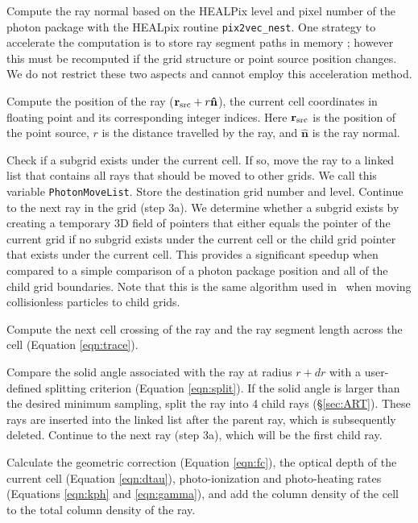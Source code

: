 \documentclass[useAMS,usenatbib]{mn2e}
\begin{document}
 Compute the ray normal based on the HEALPix level and pixel
number of the photon package with the HEALpix routine
\texttt{pix2vec\_nest}.  One strategy to accelerate the computation is
to store ray segment paths in memory \citep{Abel02_RT,
  Krumholz07_ART}; however this must be recomputed if the grid
structure or point source position changes.  We do not restrict these
two aspects and cannot employ this acceleration method.

 Compute the position of the ray ($\mathbf{r}_{\rm src} + r
\mathbf{\hat{n}}$), the current cell coordinates in floating point and
its corresponding integer indices.  Here $\mathbf{r}_{\rm src}$ is the
position of the point source, $r$ is the distance travelled by the
ray, and $\mathbf{\hat{n}}$ is the ray normal.

 Check if a subgrid exists under the current cell.  If so,
move the ray to a linked list that contains all rays that should be
moved to other grids.  We call this variable \texttt{PhotonMoveList}.
Store the destination grid number and level.  Continue to the next ray
in the grid (step 3a).  We determine whether a subgrid exists by
creating a temporary 3D field of pointers that either equals the
pointer of the current grid if no subgrid exists under the current
cell or the child grid pointer that exists under the current cell.
This provides a significant speedup when compared to a simple
comparison of a photon package position and all of the child grid
boundaries.  Note that this is the same algorithm used in \enzo~when
moving collisionless particles to child grids.

 Compute the next cell crossing of the ray and the ray
segment length across the cell (Equation \ref{eqn:trace}).

 Compare the solid angle associated with the ray at radius
$r+dr$ with a user-defined splitting criterion (Equation
\ref{eqn:split}).  If the solid angle is larger than the desired
minimum sampling, split the ray into 4 child rays (\S\ref{sec:ART}).
These rays are inserted into the linked list after the parent ray,
which is subsequently deleted.  Continue to the next ray (step 3a),
which will be the first child ray.

 Calculate the geometric correction (Equation \ref{eqn:fc}),
the optical depth of the current cell (Equation \ref{eqn:dtau}),
photo-ionization and photo-heating rates (Equations \ref{eqn:kph} and
\ref{eqn:gamma}), and add the column density of the cell to the total
column density of the ray.
\end{document}
